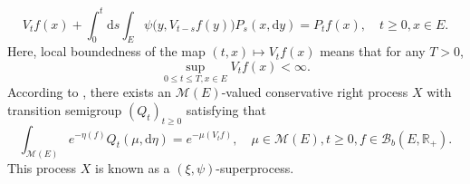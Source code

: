 \documentclass[12pt,a4paper]{amsart}
\numberwithin{equation}{section}
\theoremstyle{plain}
\theoremstyle{definition}
\theoremstyle{remark}
\begin{document}
	\begin{equation} \label{eq:M.1}
		V_tf(x) + \int_0^t  \mathrm ds \int_E  \psi\big(y, V_{t-s} f(y)\big) P_s(x, \mathrm dy)  = P_tf(x), \quad t\geq 0, x\in E.
	\end{equation}
	Here,  local boundedness of the map $(t,x) \mapsto V_tf(x)$ means that for any $T>0$,
\[
	\sup_{0\leq t\leq T, x\in E} V_tf(x) < \infty.
\]
	According to \cite[Proposition 2.21 and Theorem 5.12]{Li2011Measure-valued}, there exists
	an $\mathcal M(E)$-valued conservative right process $X$ with transition semigroup $(Q_t)_{t\geq 0}$ satisfying that
	\begin{equation} \label{eq:M.13}
	\int_{\mathcal M(E)} e^{- \eta (f)} Q_t(\mu, \mathrm d\eta) 
	= e^{- \mu(V_tf)},
	\quad \mu\in \mathcal M(E), t\geq 0, f \in \mathcal B_b(E,\mathbb R_+).
	\end{equation}
	This process $X$ is known as a $(\xi, \psi)$-superprocess.
	
\end{document}
